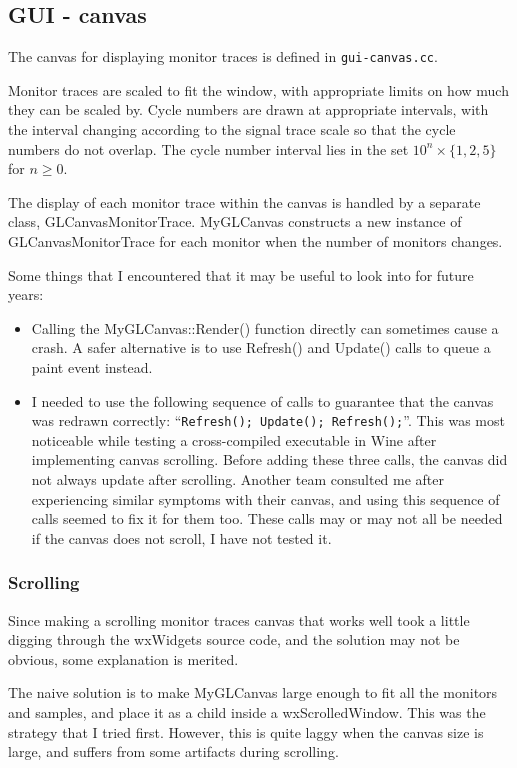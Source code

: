\documentclass[a4paper,10pt]{article}
\begin{document}
\subsection{GUI - canvas}
The canvas for displaying monitor traces is defined in \texttt{gui-canvas.cc}.

Monitor traces are scaled to fit the window, with appropriate limits on how much they can be scaled by. Cycle numbers are drawn at appropriate intervals, with the interval changing according to the signal trace scale so that the cycle numbers do not overlap. The cycle number interval lies in the set $10^n \times \{1, 2, 5\}$ for $n \geq 0$.

The display of each monitor trace within the canvas is handled by a separate class, GLCanvasMonitorTrace. MyGLCanvas constructs a new instance of GLCanvasMonitorTrace for each monitor when the number of monitors changes. 

Some things that I encountered that it may be useful to look into for future years:
\begin{itemize}
 \item Calling the MyGLCanvas::Render() function directly can sometimes cause a crash. A safer alternative is to use Refresh() and Update() calls to queue a paint event instead. 
 \item I needed to use the following sequence of calls to guarantee that the canvas was redrawn correctly: ``\texttt{Refresh(); Update(); Refresh();}''. This was most noticeable while testing a cross-compiled executable in Wine after implementing canvas scrolling. Before adding these three calls, the canvas did not always update after scrolling. Another team consulted me after experiencing similar symptoms with their canvas, and using this sequence of calls seemed to fix it for them too. These calls may or may not all be needed if the canvas does not scroll, I have not tested it.
\end{itemize}

\subsubsection{Scrolling}
Since making a scrolling monitor traces canvas that works well took a little digging through the wxWidgets source code, and the solution may not be obvious, some explanation is merited. 

The naive solution is to make MyGLCanvas large enough to fit all the monitors and samples, and place it as a child inside a wxScrolledWindow. This was the strategy that I tried first. However, this is quite laggy when the canvas size is large, and suffers from some artifacts during scrolling. 
\end{document}

